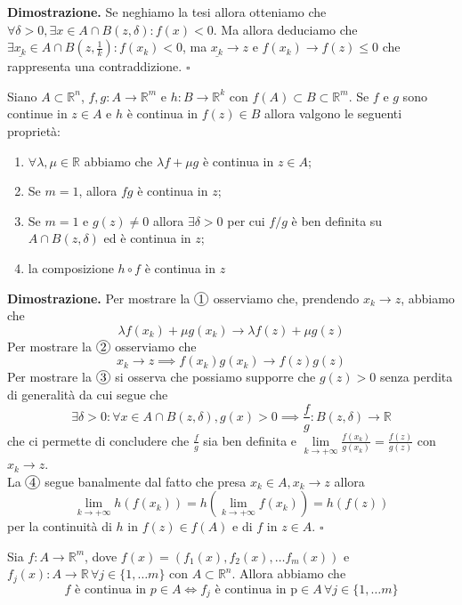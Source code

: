 \noindent \textbf{Dimostrazione. }
Se neghiamo la tesi allora otteniamo che $\forall \delta > 0, \exists x \in A \cap B(z, \delta): f(x) < 0$. Ma allora deduciamo che $\exists \underline{x_k} \in A \cap B(z, \frac{1}{k}): f(x_k) <0$, ma $\underline{x_k} \to z$ e $f(x_k) \to f(z) \leq 0$ che rappresenta una contraddizione.
\hfill $\square$

\vspace{0.5cm}
\begin{theorem}[\textcolor{blue}{C2}]
Siano $A \subset \mathbb{R}^n$, $f, g: A \to \mathbb{R}^m$ e $h: B \to \mathbb{R}^k$ con $f(A) \subset B \subset \mathbb{R}^m$. Se $f$ e $g$ sono continue in $z \in A$ e $h$ è continua in $f(z) \in B$ allora valgono le seguenti proprietà:
\begin{enumerate}[label=\protect\circled{\arabic*}]
	\item $\forall \lambda, \mu \in \mathbb{R}$ abbiamo che $\lambda f + \mu g$ è continua in $z \in A$;
	\item Se $m = 1$, allora $fg$ è continua in $z$;
	\item Se $m=1$ e $g(z) \neq 0$ allora $\exists \delta > 0$ per cui $f/g$ è ben definita su $A \cap B(z, \delta)$ ed è continua in $z$;
	 \item la composizione $h \circ f$ è continua in $z$
\end{enumerate}
\end{theorem}

\noindent \textbf{Dimostrazione. }
Per mostrare la $\circled{1}$ osserviamo che, prendendo $x_k \to z$, abbiamo che
$$
\lambda f(x_k) + \mu g(x_k) \to \lambda f(z) + \mu g(z)
$$
Per mostrare la $\circled{2}$ osserviamo che
$$
x_k \to z \implies f(x_k)g(x_k) \to f(z)g(z)
$$
Per mostrare la $\circled{3}$ si osserva che possiamo supporre che $g(z) > 0$ senza perdita di generalità da cui segue che
$$
\exists \delta > 0: \forall x \in A \cap B(z, \delta), g(x) > 0 \implies \frac{f}{g}: B(z, \delta) \to \mathbb{R}
$$
che ci permette di concludere che $\frac{f}{g}$ sia ben definita e $\lim\limits_{k \to +\infty} \frac{f(x_k)}{g(x_k)} = \frac{f(z)}{g(z)}$ con $x_k \to z$. \\
La $\circled{4}$ segue banalmente dal fatto che presa $x_k \in A, x_k \to z$ allora
$$
\lim_{k \to +\infty} h(f(x_k)) = h(\lim_{k \to +\infty} f(x_k)) = h(f(z))
$$
per la continuità di $h$ in $f(z) \in f(A)$ e di $f$ in $z \in A$.
\hfill $\square$

\vspace{0.5cm}
\begin{prop}
Sia $f: A \to \mathbb{R}^m$, dove $f(x) = (f_1(x), f_2(x), \ldots f_m(x))$ e $f_j(x): A \to \mathbb{R} \, \forall j \in \{1, \ldots m\}$ con $A \subset \mathbb{R}^n$. Allora abbiamo che
	$$f \text{ è continua in } p \in A \iff f_j \text{ è continua in p} \in A \, \forall j \in \{1, \ldots m\}$$
\end{prop}

